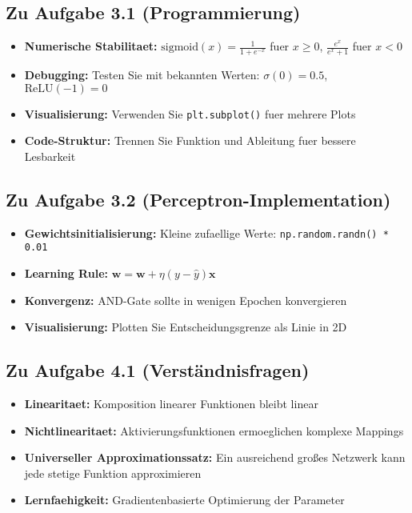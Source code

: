 ﻿\documentclass[12pt,a4paper]{article}
\begin{document}
\subsection*{Zu Aufgabe 3.1 (Programmierung)}
\begin{itemize}
    \item \textbf{Numerische Stabilitaet:} $\text{sigmoid}(x) = \frac{1}{1 + e^{-x}}$ fuer $x \geq 0$, $\frac{e^x}{e^x + 1}$ fuer $x < 0$
    \item \textbf{Debugging:} Testen Sie mit bekannten Werten: $\sigma(0) = 0.5$, $\text{ReLU}(-1) = 0$
    \item \textbf{Visualisierung:} Verwenden Sie \texttt{plt.subplot()} fuer mehrere Plots
    \item \textbf{Code-Struktur:} Trennen Sie Funktion und Ableitung fuer bessere Lesbarkeit
\end{itemize}

\subsection*{Zu Aufgabe 3.2 (Perceptron-Implementation)}
\begin{itemize}
    \item \textbf{Gewichtsinitialisierung:} Kleine zufaellige Werte: \texttt{np.random.randn() * 0.01}
    \item \textbf{Learning Rule:} $\mathbf{w} = \mathbf{w} + \eta (y - \hat{y}) \mathbf{x}$
    \item \textbf{Konvergenz:} AND-Gate sollte in wenigen Epochen konvergieren
    \item \textbf{Visualisierung:} Plotten Sie Entscheidungsgrenze als Linie in 2D
\end{itemize}

\subsection*{Zu Aufgabe 4.1 (Verständnisfragen)}
\begin{itemize}
    \item \textbf{Linearitaet:} Komposition linearer Funktionen bleibt linear
    \item \textbf{Nichtlinearitaet:} Aktivierungsfunktionen ermoeglichen komplexe Mappings
    \item \textbf{Universeller Approximationssatz:} Ein ausreichend großes Netzwerk kann jede stetige Funktion approximieren
    \item \textbf{Lernfaehigkeit:} Gradientenbasierte Optimierung der Parameter
\end{itemize}
\end{document}
